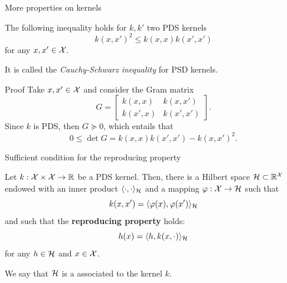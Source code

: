 \documentclass[xcolor={usenames,dvipsnames}]{beamer}
\begin{document}
\begin{frame}{More properties on kernels}

\begin{theorem}
The following inequality holds for $k, k'$ two PDS kernels
  \begin{equation*}
    k(x, x')^2 \leq k(x, x) k(x', x')
  \end{equation*}
  for any $x, x' \in {\mathcal{X}}$. 
\end{theorem}

\vspace{1cm}
It is called the \emph{Cauchy-Schwarz inequality} for PSD kernels.
\end{frame}


\begin{frame}{Proof}
Take $x, x' \in {\mathcal{X}}$ and consider the Gram matrix
  \begin{equation*}
    G = \begin{bmatrix}
      k(x, x) & k(x, x') \\
      k(x', x) & k(x', x')
    \end{bmatrix}.
  \end{equation*}
  Since $k$ is PDS, then $G \succcurlyeq 0$, which entails that
  \begin{equation*}
    0 \leq \det G = k(x, x) k(x', x') - k(x, x')^2.
  \end{equation*}
\end{frame}


\begin{frame}{Sufficient condition for the reproducing property}
\begin{theorem}
Let $k : {\mathcal{X}} \times {\mathcal{X}} \rightarrow \mathbb{R}$ be a PDS kernel. Then, there is a Hilbert space $\mathcal{H} \subset \mathbb{R}^{\mathcal{X}}$ endowed with an inner product $\langle {\cdot, \cdot} \rangle_{\mathcal{H}}$ 
  and a mapping $\varphi : {\mathcal{X}} \rightarrow \mathcal{H}$ such that
  \begin{equation*}
    k(x, x') = \langle {\varphi(x), \varphi(x')} \rangle_{\mathcal{H}}
  \end{equation*}
  and such that the \textbf{reproducing property} holds:
  \begin{equation*}
    h(x) = \langle h, k(x, \cdot) \rangle_{\mathcal{H}}
  \end{equation*}
  for any $h \in \mathcal{H}$ and $x \in {\mathcal{X}}$.
\end{theorem}
\pause

We say that $\mathcal{H}$ is a  associated to the kernel $k$.
\end{frame}
%
%
%
%
\end{document}

